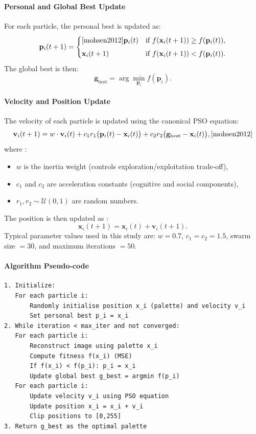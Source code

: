 \paragraph{Personal and Global Best Update}
For each particle, the personal best is updated as:
\[
\mathbf{p}_i(t+1) = \begin{cases} \cite{mohsen2012}
\mathbf{p}_i(t) & \text{if } f(\mathbf{x}_i(t+1)) \ge f(\mathbf{p}_i(t)),\\[4pt]
\mathbf{x}_i(t+1) & \text{if } f(\mathbf{x}_i(t+1)) < f(\mathbf{p}_i(t)).
\end{cases}
\]
The global best is then\cite{mohsen2012}:
\[
\mathbf{g}_{\text{best}} = \arg\min_{\mathbf{p}_i} f(\mathbf{p}_i). 
\]

\paragraph{Velocity and Position Update}
The velocity of each particle is updated using the canonical PSO equation:
\[
\mathbf{v}_i(t+1) = w \cdot \mathbf{v}_i(t) + c_1 r_1 \bigl(\mathbf{p}_i(t) - \mathbf{x}_i(t)\bigr) + c_2 r_2 \bigl(\mathbf{g}_{\text{best}} - \mathbf{x}_i(t)\bigr), \cite{mohsen2012}
\]
where \cite{mohsen2012}:
\begin{itemize}
    \item $w$ is the inertia weight (controls exploration/exploitation trade‑off), \cite{mohsen2012}
    \item $c_1$ and $c_2$ are acceleration constants (cognitive and social components),
    \item $r_1, r_2 \sim \mathcal{U}(0,1)$ are random numbers.
\end{itemize}
The position is then updated as \cite{mohsen2012}:
\[
\mathbf{x}_i(t+1) = \mathbf{x}_i(t) + \mathbf{v}_i(t+1).
\]
Typical parameter values used in this study are: $w = 0.7$, $c_1 = c_2 = 1.5$, swarm size $= 30$, and maximum iterations $= 50$. \cite{Khaleel2014}

\paragraph{Algorithm Pseudo‑code}
\begin{verbatim}
1. Initialize:
   For each particle i:
       Randomly initialise position x_i (palette) and velocity v_i
       Set personal best p_i = x_i
2. While iteration < max_iter and not converged:
   For each particle i:
       Reconstruct image using palette x_i
       Compute fitness f(x_i) (MSE)
       If f(x_i) < f(p_i): p_i = x_i
       Update global best g_best = argmin f(p_i)
   For each particle i:
       Update velocity v_i using PSO equation
       Update position x_i = x_i + v_i
       Clip positions to [0,255]
3. Return g_best as the optimal palette
\end{verbatim}


